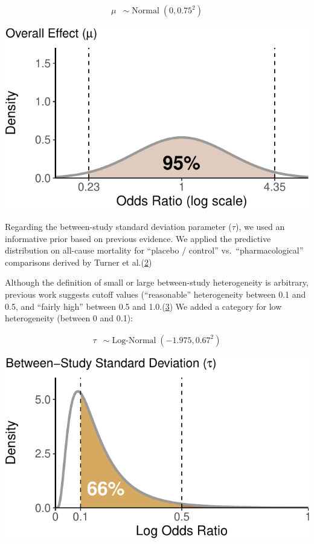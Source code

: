 \documentclass[
  12pt,
]{article}
\begin{document}
\begin{align*}
\mu & \sim \operatorname{Normal}(0, 0.75^2)
\end{align*}

\begin{center}\includegraphics{supplementary_material_files/figure-latex/mu prior visualization-1} \end{center}

\newpage

Regarding the between-study standard deviation parameter (\(\tau\)), we
used an informative prior based on previous evidence. We applied the
predictive distribution on all-cause mortality for ``placebo / control''
vs.~``pharmacological'' comparisons derived by Turner et
al.(\protect\hyperlink{ref-turner2015}{2})

Although the definition of small or large between-study heterogeneity is
arbitrary, previous work suggests cutoff values (``reasonable''
heterogeneity between 0.1 and 0.5, and ``fairly high'' between 0.5 and
1.0.(\protect\hyperlink{ref-spiegelhalter2004}{3}) We added a category
for low heterogeneity (between 0 and 0.1):

\begin{align*}
\tau & \sim \operatorname{Log-Normal}(-1.975, 0.67^2)
\end{align*}

\begin{center}\includegraphics{supplementary_material_files/figure-latex/informative tau prior visualization-1} \end{center}
\end{document}
